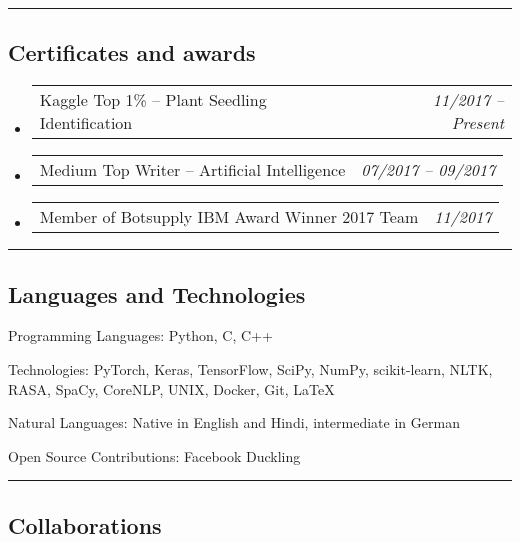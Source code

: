 \documentclass[10pt,letterpaper]{article}
\makeatletter
\newenvironment{indentsection}[1]%
{\begin{list}{}%
	{\setlength{\leftmargin}{#1}}%
	\item[]%
}
{\end{list}}
\newcommand{\headerrow}[2]
{\begin{tabular*}{\linewidth}{l@{\extracolsep{\fill}}r}
	#1 &
	#2 \\
\end{tabular*}}
\makeatother
\begin{document}
\hrule
\vspace{-0.4em}
\subsection*{Certificates and awards}

\begin{itemize}
	\parskip=0.1em
	
	\item 
	\headerrow
		{Kaggle Top 1\% -- Plant Seedling Identification}
		{\emph{11/2017 -- Present}}
	\item 
	\headerrow
		{Medium Top Writer -- Artificial Intelligence}
		{\emph{07/2017 -- 09/2017}}
	\item 
	\headerrow
		{Member of Botsupply IBM Award Winner 2017 Team}
		{\emph{11/2017}}	

\end{itemize}

\hrule
\vspace{-0.4em}
\subsection*{Languages and Technologies}

\begin{indentsection}{\parindent}
\begin{description*}
	\item[Programming Languages:]
	Python, C, C++
	\item[Technologies:]
	PyTorch, Keras, TensorFlow, SciPy, NumPy, scikit-learn, NLTK, RASA, SpaCy, CoreNLP, UNIX, Docker, Git, \LaTeX
	\item[Natural Languages:]
	Native in English and Hindi, intermediate in German	
	\item[Open Source Contributions:]
	Facebook Duckling
\end{description*}
\end{indentsection}

\hrule
\vspace{-0.4em}
\subsection*{Collaborations}
\end{document}
